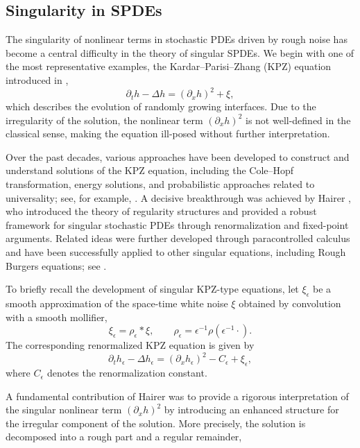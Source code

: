 \documentclass{article}
\numberwithin{equation}{section}
\begin{document}
\subsection{Singularity in SPDEs}
\par The singularity of nonlinear terms in stochastic PDEs driven by rough noise has become a central difficulty in the theory of singular SPDEs. We begin with one of the most representative examples, the Kardar--Parisi--Zhang (KPZ) equation introduced in \cite{kardar1986dynamic},
\begin{equation}
    \partial_t h-\Delta h=(\partial_x h)^2+\xi ,
\end{equation}
which describes the evolution of randomly growing interfaces. Due to the irregularity of the solution, the nonlinear term $(\partial_x h)^2$ is not well-defined in the classical sense, making the equation ill-posed without further interpretation.
\par Over the past decades, various approaches have been developed to construct and understand solutions of the KPZ equation, including the Cole--Hopf transformation, energy solutions, and probabilistic approaches related to universality; see, for example, \cite{bertini1997stochastic,gonccalves2014nonlinear,alberts2014intermediate}. A decisive breakthrough was achieved by Hairer \cite{hairer2013solving}, who introduced the theory of regularity structures and provided a robust framework for singular stochastic PDEs through renormalization and fixed-point arguments. Related ideas were further developed through paracontrolled calculus and have been successfully applied to other singular equations, including Rough Burgers equations; see \cite{gubinelli2015paracontrolled,gubinelli2017kpz,catellier2018paracontrolled,gubinelli2023paracontrolled,hairerTheoryRegularityStructures2014}.
\par To briefly recall the development of singular KPZ-type equations, let 
$\xi_\epsilon$ be a smooth approximation of the space-time white noise $\xi$ obtained by convolution with a smooth mollifier,
\[
\xi_\epsilon=\rho_\epsilon *\xi,
\qquad 
\rho_\epsilon=\epsilon^{-1}\rho(\epsilon^{-1}\cdot).
\]
The corresponding renormalized KPZ equation is given by
\begin{equation}
    \partial_t h_\epsilon-\Delta h_\epsilon
    =(\partial_x h_\epsilon)^2-C_\epsilon+\xi_\epsilon ,
\end{equation}
where $C_\epsilon$ denotes the renormalization constant.
\par A fundamental contribution of Hairer was to provide a rigorous interpretation of the singular nonlinear term $(\partial_x h)^2$ by introducing an enhanced structure for the irregular component of the solution. More precisely, the solution is decomposed into a rough part and a regular remainder,
\end{document}
